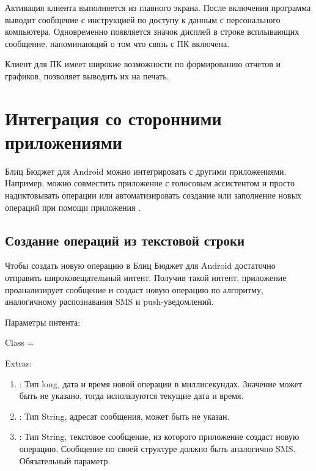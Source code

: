 \documentclass[a4paper,10pt,russian]{sphinxmanual}
\begin{document}
\noindent{}
\noindent{}
\noindent{}

Активация клиента выполняется из главного экрана. После включения программа выводит сообщение с инструкцией
по доступу к данным с персонального компьютера. Одновременно появляется значок дисплей в строке всплывающих
сообщение, напоминающий о том что связь с ПК включена.

Клиент для ПК имеет широкие возможности по формированию отчетов и графиков, позволяет выводить их на печать.


\chapter{Интеграция со сторонними приложениями}
\label{\detokenize{api:chapter-api}}\label{\detokenize{api:id1}}\label{\detokenize{api::doc}}
Блиц Бюджет для Android можно интегрировать с другими приложениями. Например, можно совместить приложение с голосовым
ассистентом и просто надиктовывать операции или автоматизировать создание или заполнение новых операций при помощи
приложения .


\section{Создание операций из текстовой строки}
\label{\detokenize{api:id2}}
Чтобы создать новую операцию в Блиц Бюджет для Android достаточно отправить широковещательный интент. Получив такой
интент, приложение проанализирует сообщение и создаст новую операцию по алгоритму, аналогичному распознавания SMS
и push-уведомлений.

Параметры интента:

Class = 

Extras:
\begin{enumerate}
\def\theenumi{\arabic{enumi}}
\def\labelenumi{\theenumi .}
\makeatletter\def\p@enumii{\p@enumi \theenumi .}\makeatother
\item {} 
: Тип long, дата и время новой операции в миллисекундах. Значение может быть не указано, тогда используются текущие дата и время.

\item {} 
: Тип String, адресат сообщения, может быть не указан.

\item {} 
: Тип String, текстовое сообщение, из которого приложение создаст новую операцию. Сообщение по своей структуре должно быть аналогично SMS. Обязательный параметр.

\end{enumerate}
\end{document}
